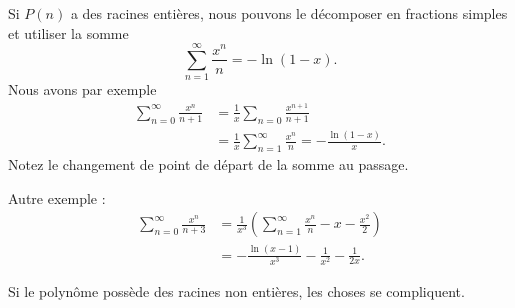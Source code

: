 Si \( P(n)\) a des racines entières, nous pouvons le décomposer en fractions simples et utiliser la somme
\begin{equation}
	\sum_{n=1}^{\infty}\frac{ x^n }{ n }=-\ln(1-x).
\end{equation}
Nous avons par exemple
\begin{subequations}
	\begin{align}
		\sum_{n=0}^{\infty}\frac{x^n}{ n+1 } & =\frac{1}{ x }\sum_{n=0}\frac{ x^{n+1} }{ n+1 }                             \\
		                                     & =\frac{1}{ x }\sum_{n=1}^{\infty}\frac{ x^n }{ n }=-\frac{ \ln(1-x) }{ x }.
	\end{align}
\end{subequations}
Notez le changement de point de départ de la somme au passage.

Autre exemple :
\begin{subequations}
	\begin{align}
		\sum_{n=0}^{\infty}\frac{ x^n }{ n+3 } & =\frac{1}{ x^3 }\left( \sum_{n=1}^{\infty}\frac{ x^n }{ n }-x-\frac{ x^2 }{ 2 } \right) \\
		                                       & =-\frac{ \ln(x-1) }{ x^3 }-\frac{1}{ x^2 }-\frac{1}{ 2x }.
	\end{align}
\end{subequations}

Si le polynôme possède des racines non entières, les choses se compliquent.

